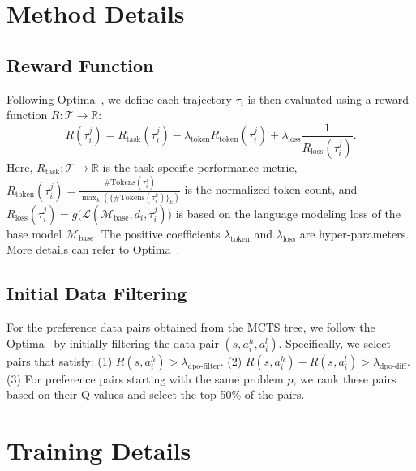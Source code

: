\appendix
\onecolumn



\section{Method Details}
\label{appendix:method_details}

\subsection{Reward Function}
Following Optima~\cite{DBLP:journals/corr/abs-2410-08115}, we define each trajectory $\tau_i$ is then evaluated using a reward function $R: \mathcal{T} \rightarrow \mathbb{R}$:
\begin{equation}
    R(\tau_i^j) = R_\text{task}(\tau_i^j) - \lambda_\text{token} R_\text{token}(\tau_i^j) + \lambda_\text{loss} \frac{1}{R_\text{loss}(\tau_i^j)}.
    \label{eq:reward}
\end{equation}
Here, $R_\text{task}: \mathcal{T} \rightarrow \mathbb{R}$ is the task-specific performance metric, $R_\text{token}(\tau_i^j) = \frac{\#\text{Tokens}(\tau_i^j)}{\max_k(\{\#\text{Tokens}(\tau_i^k)\}_k)}$ is the normalized token count, and $R_\text{loss}(\tau_i^j) = g\big(\mathcal{L}(\mathcal{M}_\text{base}, d_i, \tau_i^j)\big)$ is based on the language modeling loss of the base model $\mathcal{M}_\text{base}$. The positive coefficients $\lambda_\text{token}$ and $\lambda_\text{loss}$ are hyper-parameters. More details can refer to Optima~\cite{DBLP:journals/corr/abs-2410-08115}.

\subsection{Initial Data Filtering}
For the preference data pairs obtained from the MCTS tree, we follow the Optima~\cite{DBLP:journals/corr/abs-2410-08115} by initially filtering the data pair $(s, a_i^h, a_i^l)$. Specifically, we select pairs that satisfy: (1) $R(s, a_i^h) > \lambda_{\text{dpo-filter}}$. (2) $R(s, a_i^h)- R(s, a_i^l)>\lambda_{\text{dpo-diff}}$. (3) For preference pairs starting with the same problem $p$, we rank these pairs based on their Q-values and select the top 50\% of the pairs.

\section{Training Details}
\label{appendix:training details}

